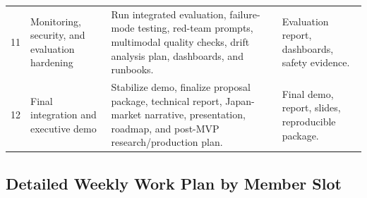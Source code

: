 \begin{longtable}{p{}p{}p{}p{}}
11 & Monitoring, security, and evaluation hardening & Run integrated evaluation, failure-mode testing, red-team prompts, multimodal quality checks, drift analysis plan, dashboards, and runbooks. & Evaluation report, dashboards, safety evidence. \\
12 & Final integration and executive demo & Stabilize demo, finalize proposal package, technical report, Japan-market narrative, presentation, roadmap, and post-MVP research/production plan. & Final demo, report, slides, reproducible package. \\
\bottomrule
\end{longtable}

\subsection{Detailed Weekly Work Plan by Member Slot}

